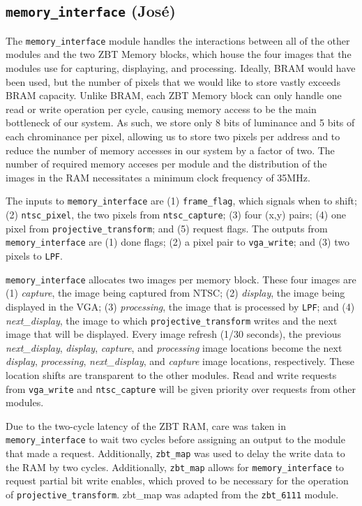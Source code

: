 \documentclass[10pt]{article}
\begin{document}
\subsection{{\tt memory\_interface} (Jos\'{e})}
The {\tt memory\_interface} module handles the interactions between all of the other modules and the two ZBT Memory blocks, which house the four images that the modules use for capturing, displaying, and processing. Ideally, BRAM would have been used, but the number of pixels that we would like to store vastly exceeds BRAM capacity. Unlike BRAM, each ZBT Memory block can only handle one read or write operation per cycle, causing memory access to be the main bottleneck of our system. As such, we store only 8 bits of luminance and 5 bits of each chrominance per pixel, allowing us to store two pixels per address and to reduce the number of memory accesses in our system by a factor of two. The number of required memory acceses per module and the distribution of the images in the RAM necessitates a minimum clock frequency of 35MHz.

The inputs to {\tt memory\_interface} are (1) {\tt frame\_flag}, which signals when to shift; (2) {\tt ntsc\_pixel}, the two pixels from {\tt ntsc\_capture}; (3) four (x,y) pairs; (4) one pixel from {\tt projective\_transform}; and (5) request flags. The outputs from {\tt memory\_interface} are (1) done flags; (2) a pixel pair to {\tt vga\_write}; and (3) two pixels to {\tt LPF}.

{\tt memory\_interface} allocates two images per memory block. These four images are (1) {\it capture}, the image being captured from NTSC; (2) {\it display}, the image being displayed in the VGA; (3) {\it processing}, the image that is processed by {\tt LPF}; and (4) {\it next\_display}, the image to which {\tt projective\_transform} writes and the next image that will be displayed. Every image refresh (1/30 seconds), the previous {\it next\_display}, {\it display}, {\it capture}, and {\it processing} image locations become the next {\it display}, {\it processing}, {\it next\_display}, and {\it capture} image locations, respectively. These location shifts are transparent to the other modules. Read and write requests from {\tt vga\_write} and {\tt ntsc\_capture} will be given priority over requests from other modules.

Due to the two-cycle latency of the ZBT RAM, care was taken in {\tt memory\_interface} to wait two cycles before assigning an output to the module that made a request. Additionally, {\tt zbt\_map} was used to delay the write data to the RAM by two cycles. Additionally, {\tt zbt\_map} allows for {\tt memory\_interface} to request partial bit write enables, which proved to be necessary for the operation of {\tt projective\_transform}. {zbt\_map} was adapted from the {\tt zbt\_6111} module.
\end{document}
